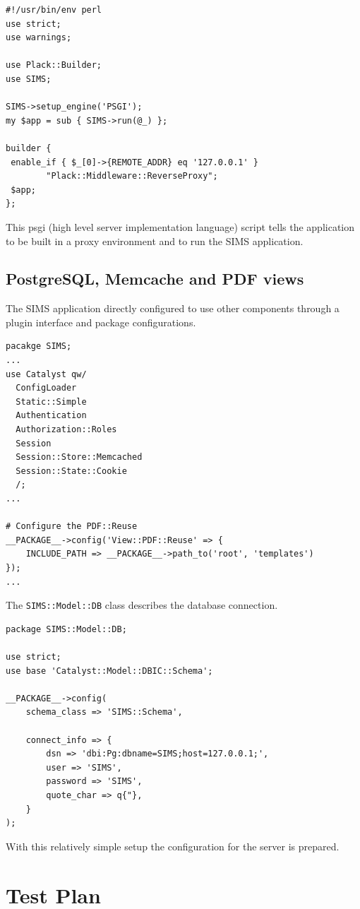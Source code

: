 \documentclass{journal}
\begin{document}
\begin{verbatim}
#!/usr/bin/env perl
use strict;
use warnings;

use Plack::Builder;
use SIMS;

SIMS->setup_engine('PSGI');
my $app = sub { SIMS->run(@_) };

builder {
 enable_if { $_[0]->{REMOTE_ADDR} eq '127.0.0.1' }
        "Plack::Middleware::ReverseProxy";
 $app;
};
\end{verbatim}

This psgi (high level server implementation language) script tells the application to be built in a proxy environment and to run the SIMS application. 

\subsection{PostgreSQL, Memcache and PDF views}

The SIMS application directly configured to use other components through a plugin interface and
package configurations.

\begin{verbatim}
pacakge SIMS;
...
use Catalyst qw/
  ConfigLoader
  Static::Simple
  Authentication
  Authorization::Roles
  Session
  Session::Store::Memcached
  Session::State::Cookie
  /;
...

# Configure the PDF::Reuse 
__PACKAGE__->config('View::PDF::Reuse' => { 
	INCLUDE_PATH => __PACKAGE__->path_to('root', 'templates') 
});
...
\end{verbatim}

The \verb+SIMS::Model::DB+ class describes the database connection.

\begin{verbatim}
package SIMS::Model::DB;

use strict;
use base 'Catalyst::Model::DBIC::Schema';

__PACKAGE__->config(
    schema_class => 'SIMS::Schema',
    
    connect_info => {
        dsn => 'dbi:Pg:dbname=SIMS;host=127.0.0.1;',
        user => 'SIMS',
        password => 'SIMS',
        quote_char => q{"},
    }
);

\end{verbatim}

With this relatively simple setup the configuration for the server is prepared.
\section{Test Plan}
 
\end{document}
